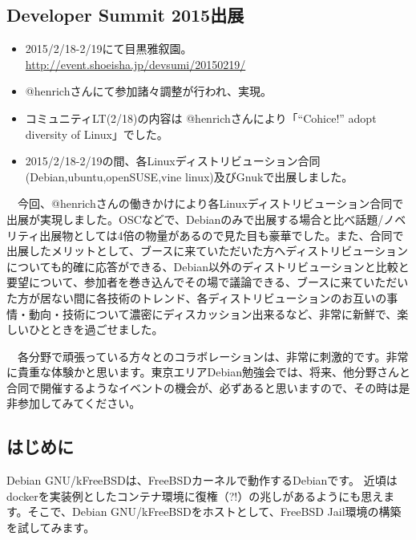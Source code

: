 \documentclass[mingoth,a4paper]{jsarticle}
\begin{document}
\subsection{Developer Summit 2015出展}

\begin{itemize}
\item 2015/2/18-2/19にて目黒雅叙園。\url{http://event.shoeisha.jp/devsumi/20150219/}
\item @henrichさんにて参加諸々調整が行われ、実現。
\item コミュニティLT(2/18)の内容は @henrichさんにより「``Cohice!'' adopt diversity of Linux」でした。
\item 2015/2/18-2/19の間、各Linuxディストリビューション合同(Debian,ubuntu,openSUSE,vine linux)及びGnukで出展しました。
\end{itemize} 

　今回、@henrichさんの働きかけにより各Linuxディストリビューション合同で出展が実現しました。OSCなどで、Debianのみで出展する場合と比べ話題/ノベリティ出展物としては4倍の物量があるので見た目も豪華でした。また、合同で出展したメリットとして、ブースに来ていただいた方へディストリビューションについても的確に応答ができる、Debian以外のディストリビューションと比較と要望について、参加者を巻き込んでその場で議論できる、ブースに来ていただいた方が居ない間に各技術のトレンド、各ディストリビューションのお互いの事情・動向・技術について濃密にディスカッション出来るなど、非常に新鮮で、楽しいひとときを過ごせました。

　各分野で頑張っている方々とのコラボレーションは、非常に刺激的です。非常に貴重な体験かと思います。東京エリアDebian勉強会では、将来、他分野さんと合同で開催するようなイベントの機会が、必ずあると思いますので、その時は是非参加してみてください。



\subsection{はじめに}

Debian GNU/kFreeBSDは、FreeBSDカーネルで動作するDebianです。
近頃はdockerを実装例としたコンテナ環境に復権（?!）の兆しがあるようにも思えます。そこで、Debian GNU/kFreeBSDをホストとして、FreeBSD Jail環境の構築を試してみます。
\end{document}
